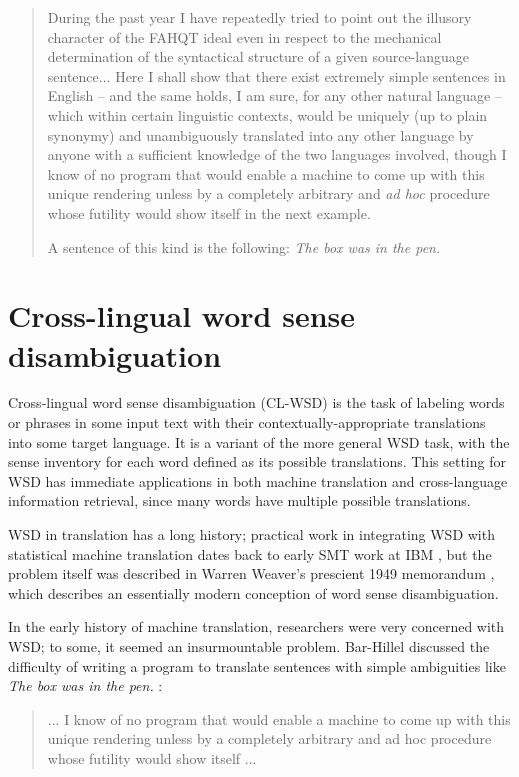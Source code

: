 \begin{quote}
During the past year I have repeatedly tried to point out the illusory
character of the FAHQT ideal even in respect to the mechanical determination of
the syntactical structure of a given source-language sentence... Here I shall
show that there exist extremely simple sentences in English -- and the same
holds, I am sure, for any other natural language -- which within certain
linguistic contexts, would be uniquely (up to plain synonymy) and unambiguously
translated into any other language by anyone with a sufficient knowledge of the
two languages involved, though I know of no program that would enable a machine
to come up with this unique rendering unless by a completely arbitrary and
\emph{ad hoc} procedure whose futility would show itself in the next example.

A sentence of this kind is the following: \emph{The box was in the pen.}
\end{quote}

\section{Cross-lingual word sense disambiguation}
\label{sec:clwsd}

Cross-lingual word sense disambiguation (CL-WSD) is the task of labeling words
or phrases in some input text with their contextually-appropriate translations
into some target language.
It is a variant of the more general WSD task, with the sense inventory for each
word defined as its possible translations.
This setting for WSD has immediate applications in both machine translation and
cross-language information retrieval, since many words have multiple possible
translations.

WSD in translation has a long history; practical work in integrating
WSD with statistical machine translation dates back to early SMT work at IBM
\cite{Brown91word-sensedisambiguation}, but the problem itself was described in
Warren Weaver's prescient 1949 memorandum \cite{weavermemo}, which describes an
essentially modern conception of word sense disambiguation.

In the early history of machine translation, researchers were very concerned
with WSD; to some, it seemed an insurmountable problem. Bar-Hillel 
discussed the difficulty of writing a program to translate sentences with
simple ambiguities like \emph{The box was in the pen.} \cite{barhillel1960}:

\begin{quote}
... I know of no program that would enable a machine to come up with this
unique rendering unless by a completely arbitrary and ad hoc procedure whose
futility would show itself ...
\end{quote}

